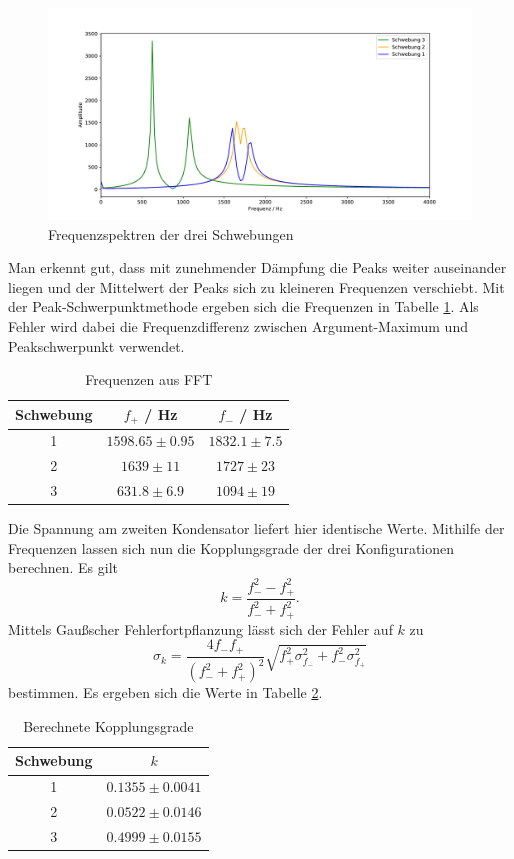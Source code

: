 \begin{figure}
\centering
\includegraphics[width=\textwidth]{plots/FFT_schwebungen.pdf}
\caption{Frequenzspektren der drei Schwebungen}
\label{abb:FFT_schwebung}
\end{figure}

Man erkennt gut, dass mit zunehmender Dämpfung die Peaks weiter auseinander liegen und der Mittelwert der Peaks sich zu kleineren Frequenzen verschiebt. Mit der Peak-Schwerpunktmethode ergeben sich die Frequenzen in Tabelle \ref{tab:freq_schweb}. Als Fehler wird dabei die Frequenzdifferenz zwischen Argument-Maximum und Peakschwerpunkt verwendet.

\begin{table}[H]
\centering
\begin{tabular}{c|c|c}
Schwebung & $f_+$ / Hz & $f_-$ / Hz \\
\hline
1 & $1598.65 \pm 0.95$ & $1832.1 \pm 7.5$ \\
2 & $1639 \pm 11$ & $1727 \pm 23$ \\
3 & $631.8 \pm 6.9$ & $1094 \pm 19$
\end{tabular}
\caption{Frequenzen aus FFT}
\label{tab:freq_schweb}
\end{table}

Die Spannung am zweiten Kondensator liefert hier identische Werte. Mithilfe der Frequenzen lassen sich nun die Kopplungsgrade der drei Konfigurationen berechnen. Es gilt
$$k = \frac{f_-^2 - f_+^2}{f_-^2 + f_+^2}.$$
Mittels Gaußscher Fehlerfortpflanzung lässt sich der Fehler auf $k$ zu
$$\sigma_k = \frac{4f_-f_+}{(f_-^2+f_+^2)^2} \sqrt{f_+^2 \sigma_{f_-}^2 + f_-^2 \sigma_{f_+}^2}$$
bestimmen. Es ergeben sich die Werte in Tabelle \ref{tab:kopplung}.

\begin{table}[H]
\centering
\begin{tabular}{c|c}
Schwebung & $k$ \\
\hline
1 & $0.1355 \pm 0.0041$ \\
2 & $0.0522 \pm 0.0146$ \\
3 & $0.4999 \pm 0.0155$
\end{tabular}
\caption{Berechnete Kopplungsgrade}
\label{tab:kopplung}
\end{table}

